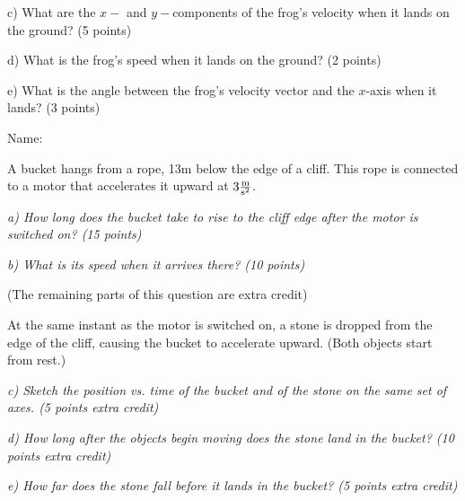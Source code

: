 \documentclass[12pt]{article}
\begin{document}
\vspace{1.2in}

c) What are the $x-$ and $y-$components of the frog's velocity when it lands on the ground? (5 points)

\vspace{1.2in}

d) What is the frog's speed when it lands on the ground? (2 points)

\vspace{1in}

e) What is the angle between the frog's velocity vector and the $x$-axis when it lands? (3 points)

\bigskip

\newpage
\begin{flushright}
  Name: \underline{\hspace{3in}}
\end{flushright}




\Large \centerline{}
\normalsize

A bucket hangs from a rope, 13m below the edge of a cliff. This rope is connected to a motor that accelerates it upward at $3 \frac{\rm m}{\rm s^2}$.

\it{a) How long does the bucket take to rise to the cliff edge after the motor is switched on? (15 points)}

\vspace{1in}

\it{b) What is its speed when it arrives there? (10 points})

\vspace{1in}

\rm \centerline{(The remaining parts of this question are extra credit)}

At the same instant as the motor is switched on, a stone is dropped from the edge of the cliff, causing the bucket to accelerate upward. (Both objects start from rest.)

\bigskip

\it{c) Sketch the position vs. time of the bucket and of the stone on the same set of axes. (5 points extra credit)}

\vspace{1in}

\it{d) How long after the objects begin moving does the stone land in the bucket? (10 points extra credit)}

\vspace{1in}

\it{e) How far does the stone fall before it lands in the bucket? (5 points extra credit)}
\end{document}
